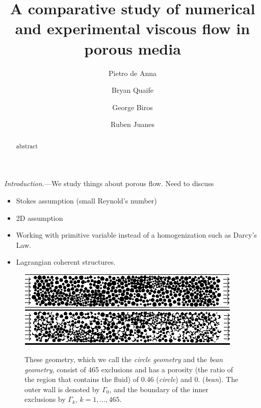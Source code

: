 \documentclass[twocolumn,showpacs,pre,preprintnumbers,floatfix]{revtex4-1}
\newif\ifTikz
\begin{document}
\title{A comparative study of numerical and experimental viscous flow
in porous media}

\author{Pietro de Anna}
\author{Bryan Quaife}
\author{George Biros}
\author{Ruben Juanes}

\begin{abstract}
abstract
\end{abstract}

\maketitle

{\em Introduction.}---We study things about porous flow.  Need to
discuss
\begin{itemize}
  \item Stokes assumption (small Reynold's number)
  \item 2D assumption
  \item Working with primitive variable instead of a homogenization such
  as Darcy's Law.
  \item Lagrangian coherent structures.
\end{itemize}
\begin{figure}[htps]
\ifTikz
\centering
  
  
\else
  \includegraphics{circleGrains.pdf}
  \includegraphics{beanGrains.pdf}
\fi
\caption{\label{f:beans} These geometry, which we call the {\em circle
geometry} and the {\em bean geometry}, consist of 465 exclusions and
has a porosity (the ratio of the region that contains the fluid) of
0.46 ({\em circle}) and 0. ({\em bean}).  The outer wall is denoted
by $\Gamma_{0}$, and the boundary of the inner exclusions by
$\Gamma_{k}$, $k=1,\ldots,465$.}
\end{figure}
\end{document}
